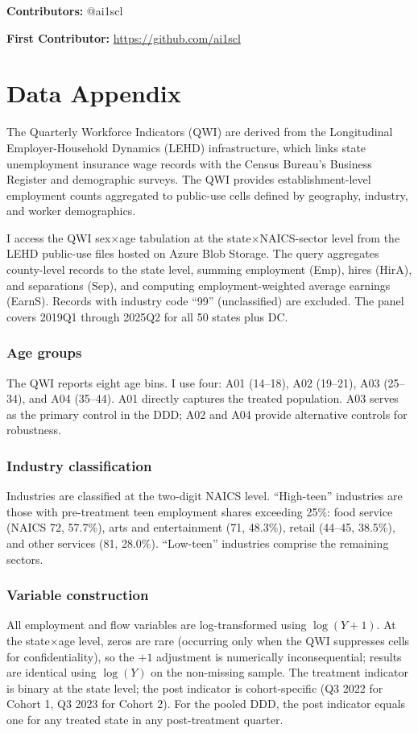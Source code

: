 \documentclass[12pt]{article}
\begin{document}
\noindent\textbf{Contributors:} @ai1scl

\noindent\textbf{First Contributor:} \url{https://github.com/ai1scl}

\label{apep_main_text_end}
\newpage


\newpage
\appendix

\section{Data Appendix}
\label{app:data}

The Quarterly Workforce Indicators (QWI) are derived from the Longitudinal Employer-Household Dynamics (LEHD) infrastructure, which links state unemployment insurance wage records with the Census Bureau's Business Register and demographic surveys. The QWI provides establishment-level employment counts aggregated to public-use cells defined by geography, industry, and worker demographics.

I access the QWI sex$\times$age tabulation at the state$\times$NAICS-sector level from the LEHD public-use files hosted on Azure Blob Storage. The query aggregates county-level records to the state level, summing employment (Emp), hires (HirA), and separations (Sep), and computing employment-weighted average earnings (EarnS). Records with industry code ``99'' (unclassified) are excluded. The panel covers 2019Q1 through 2025Q2 for all 50 states plus DC.

\subsubsection*{Age groups} The QWI reports eight age bins. I use four: A01 (14--18), A02 (19--21), A03 (25--34), and A04 (35--44). A01 directly captures the treated population. A03 serves as the primary control in the DDD; A02 and A04 provide alternative controls for robustness.

\subsubsection*{Industry classification} Industries are classified at the two-digit NAICS level. ``High-teen'' industries are those with pre-treatment teen employment shares exceeding 25\%: food service (NAICS 72, 57.7\%), arts and entertainment (71, 48.3\%), retail (44--45, 38.5\%), and other services (81, 28.0\%). ``Low-teen'' industries comprise the remaining sectors.

\subsubsection*{Variable construction} All employment and flow variables are log-transformed using $\log(Y + 1)$. At the state$\times$age level, zeros are rare (occurring only when the QWI suppresses cells for confidentiality), so the $+1$ adjustment is numerically inconsequential; results are identical using $\log(Y)$ on the non-missing sample. The treatment indicator is binary at the state level; the post indicator is cohort-specific (Q3 2022 for Cohort 1, Q3 2023 for Cohort 2). For the pooled DDD, the post indicator equals one for any treated state in any post-treatment quarter.
\end{document}
